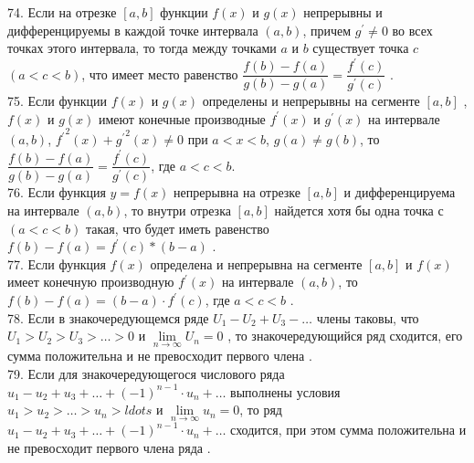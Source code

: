 \documentclass[12pt]{article}
\begin{document}
74. Если на отрезке ${\displaystyle [a,b]}$ функции ${\displaystyle f(x)}$ и ${\displaystyle g(x)}$ непрерывны и дифференцируемы в каждой точке интервала ${\displaystyle (a,b)}$, причем  ${\displaystyle g^{\prime}\neq 0}$ во всех точках этого интервала, то тогда между точками ${\displaystyle a}$ и  ${\displaystyle b}$ существует точка ${\displaystyle c}$ ${\displaystyle (a<c<b)}$, что имеет место равенство ${\displaystyle \dfrac{f(b)-f(a)}{g(b)-g(a)}=\dfrac{f^{\prime}(c)}{g^{\prime}(c)}}$ .\\

75. Если функции ${\displaystyle f(x)}$ и ${\displaystyle g(x)}$ определены и непрерывны на сегменте ${\displaystyle [a,b]}$ , ${\displaystyle f(x)}$ и ${\displaystyle g(x)}$ имеют конечные производные ${\displaystyle f^{\prime}(x)}$  и ${\displaystyle g^{\prime}(x)}$ на интервале ${\displaystyle (a,b)}$, ${\displaystyle {f^{\prime}}^2(x)+{g^{\prime}}^2(x) \neq 0}$ при ${\displaystyle a<x<b}$, ${\displaystyle g(a)\neq g(b)}$, то ${\displaystyle \dfrac{f(b)-f(a)}{g(b)-g(a)}=\dfrac{f^{\prime}(c)}{g^{\prime}(c)}}$, где ${\displaystyle a<c<b}$.\\

76. Если функция ${\displaystyle y=f(x)}$ непрерывна на отрезке ${\displaystyle [a,b]}$ и дифференцируема на интервале ${\displaystyle (a,b)}$, то внутри отрезка ${\displaystyle [a,b]}$ найдется хотя бы одна точка ${\displaystyle с}$ ${(\displaystyle a<c<b)}$ такая, что будет иметь равенство ${\displaystyle f(b)-f(a)=f^{\prime}(c)*(b-a)}$ .\\

77. Если функция ${\displaystyle f(x)}$ определена и непрерывна на сегменте ${\displaystyle [a,b]}$ и ${\displaystyle f(x)}$ имеет конечную производную ${\displaystyle f^{\prime}(x)}$ на интервале ${\displaystyle (a,b)}$, то ${\displaystyle f(b)-f(a)=(b-a)\cdot f^{\prime}(c)}$, где ${\displaystyle a<c<b}$ .\\

78. Если в знакочередующемся ряде ${\displaystyle U_1-U_2+U_3-\ldots}$ члены таковы, что ${\displaystyle U_1>U_2>U_3>\ldots>0}$ и ${\displaystyle \lim \limits _{n \to \infty} U_n=0}$ , то знакочередующийся ряд сходится, его сумма положительна и не превосходит первого члена .\\

79. Если для знакочередующегося числового ряда ${\displaystyle u_1-u_2+u_3+\ldots+(-1)^{n-1}\cdot u_n+\ldots}$ выполнены условия ${\displaystyle u_1>u_2>\ldots>u_n>ldots}$ и ${\displaystyle \lim \limits _{n \to \infty} u_n=0}$, то ряд ${\displaystyle u_1-u_2+u_3+\ldots+(-1)^{n-1}\cdot u_n+\ldots}$ сходится, при этом сумма положительна и не превосходит первого члена ряда .\\
\end{document}
